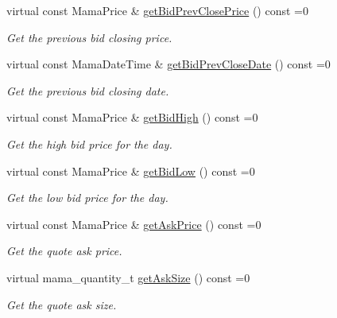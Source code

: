 \begin{CompactItemize}
virtual const Mama\-Price \& \hyperlink{classWombat_1_1MamdaQuoteRecap_5a0ba795de4b02302093d082484030f8}{get\-Bid\-Prev\-Close\-Price} () const =0
\begin{CompactList}\small\item\em Get the previous bid closing price. \item\end{CompactList}\item 
virtual const Mama\-Date\-Time \& \hyperlink{classWombat_1_1MamdaQuoteRecap_2695af7f24f5782cf586e354eefe41fe}{get\-Bid\-Prev\-Close\-Date} () const =0
\begin{CompactList}\small\item\em Get the previous bid closing date. \item\end{CompactList}\item 
virtual const Mama\-Price \& \hyperlink{classWombat_1_1MamdaQuoteRecap_c8ebabdee903b477922310050931ced6}{get\-Bid\-High} () const =0
\begin{CompactList}\small\item\em Get the high bid price for the day. \item\end{CompactList}\item 
virtual const Mama\-Price \& \hyperlink{classWombat_1_1MamdaQuoteRecap_8ee3dce6e5aab4ef5219e3bacb98798d}{get\-Bid\-Low} () const =0
\begin{CompactList}\small\item\em Get the low bid price for the day. \item\end{CompactList}\item 
virtual const Mama\-Price \& \hyperlink{classWombat_1_1MamdaQuoteRecap_c2eadf54aa31c75012df3101c8200861}{get\-Ask\-Price} () const =0
\begin{CompactList}\small\item\em Get the quote ask price. \item\end{CompactList}\item 
virtual mama\_\-quantity\_\-t \hyperlink{classWombat_1_1MamdaQuoteRecap_1f30128c51192c26ccaf81bff1a5ef1b}{get\-Ask\-Size} () const =0
\begin{CompactList}\small\item\em Get the quote ask size. \item\end{CompactList}\item 

\end{CompactItemize}
